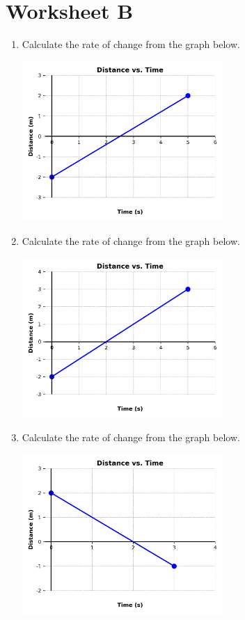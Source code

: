 \documentclass[12pt]{article}
\begin{document}
\section*{Worksheet B}
\begin{enumerate}
\item Calculate the rate of change from the graph below.

\includegraphics[width=0.6\textwidth]{B_problem_1.png}


\vspace{2cm}  %
\item Calculate the rate of change from the graph below.

\includegraphics[width=0.6\textwidth]{B_problem_2.png}


\vspace{2cm}  %
\item Calculate the rate of change from the graph below.

\includegraphics[width=0.6\textwidth]{B_problem_3.png}



\end{enumerate}
\end{document}
